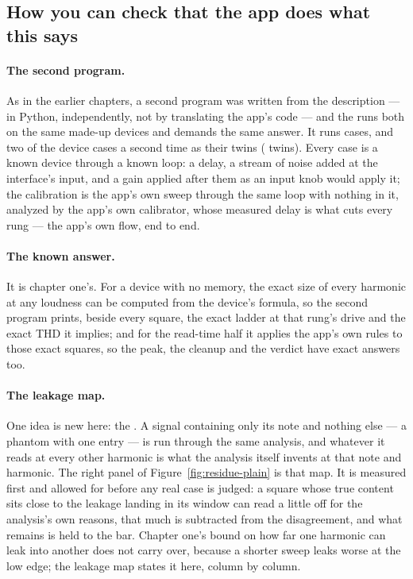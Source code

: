 \documentclass[11pt,a4paper]{article}
\begin{document}
\subsection{How you can check that the app does what this says}

\paragraph{The second program.} As in the earlier chapters, a second program was written from the
description --- in Python, independently, not by translating the app's
code --- and the  runs both on the same made-up devices and
demands the same answer. It runs \jparityCaseCount{} cases, and two of
the device cases a second time as their  twins
(\jparityTwinCount{} twins). Every case is a known device through a
known loop: a delay, a stream of noise added at the interface's input,
and a gain applied after them as an input knob would apply it; the
calibration is the app's own sweep through the same loop with nothing in
it, analyzed by the app's own calibrator, whose measured delay is what
cuts every rung --- the app's own flow, end to end.

\paragraph{The known answer.} It is chapter one's. For a device with no memory, the
exact size of every harmonic at any loudness can be computed from the
device's formula, so the second program prints, beside every square, the
exact ladder at that rung's drive and the exact THD it implies; and for
the read-time half it applies the app's own rules to those exact squares,
so the peak, the cleanup and the verdict have exact answers too.

\paragraph{The leakage map.} One idea
is new here: the . A signal
containing only its note and nothing else --- a phantom with one entry
--- is run through the same analysis, and whatever it reads at every
other harmonic is what the analysis itself invents at that note and
harmonic. The right panel of Figure~\ref{fig:residue-plain} is that map.
It is measured first and allowed for before any real case is judged: a
square whose true content sits close to the leakage landing in its
window can read a little off for the analysis's own reasons, that much
is subtracted from the disagreement, and what remains is held to the
bar. Chapter one's bound on how far one harmonic can leak into another
does not carry over, because a shorter sweep leaks worse at the low
edge; the leakage map states it here, column by column.
\end{document}
